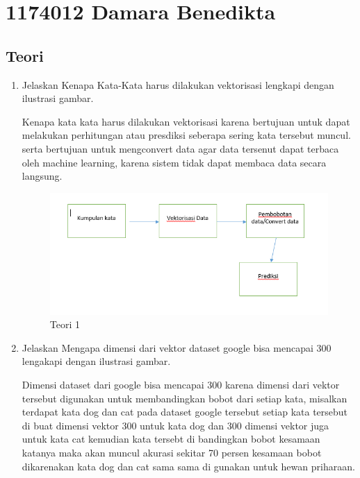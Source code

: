 \section{1174012 Damara Benedikta}

\subsection{Teori}
\begin{enumerate}

\item Jelaskan Kenapa Kata-Kata harus dilakukan vektorisasi lengkapi dengan ilustrasi gambar.\par
Kenapa kata kata harus dilakukan vektorisasi karena bertujuan untuk dapat melakukan perhitungan atau presdiksi 
seberapa sering kata tersebut muncul. serta bertujuan untuk mengconvert data agar data tersenut dapat terbaca oleh machine learning, 
karena sistem tidak dapat membaca data secara langsung.

\begin{figure}[ht]
\centering
\includegraphics[scale=0.6]{figures/1174012/chapter5/1,1.png}
\caption{Teori 1}
\label{contoh}
\end{figure}

\item Jelaskan Mengapa dimensi dari vektor dataset google bisa mencapai 300 lengakapi dengan ilustrasi gambar. \par
Dimensi dataset dari google bisa mencapai 300 karena dimensi dari vektor tersebut digunakan untuk membandingkan bobot dari setiap kata, 
misalkan terdapat kata dog dan cat pada dataset google tersebut setiap kata tersebut di buat dimensi vektor 300 untuk kata dog dan 
300 dimensi vektor juga untuk kata cat kemudian kata tersebt di bandingkan bobot kesamaan katanya maka akan muncul akurasi sekitar 70 
persen kesamaan bobot dikarenakan kata dog dan cat sama sama di gunakan untuk hewan priharaan.


\end{enumerate}
